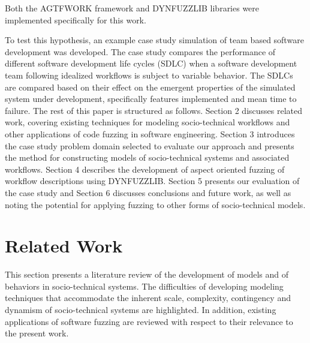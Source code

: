 \documentclass{llncs}
\begin{document}
Both the AGTFWORK framework and DYNFUZZLIB libraries were implemented specifically for this work.

To test this hypothesis, an example case study simulation of team based software development was developed.  The case
study compares the performance of different software development life cycles (SDLC) when a software development team
following idealized workflows is subject to variable behavior.  The SDLCs are compared based on their effect on the
emergent properties of the simulated system under development, specifically features implemented and mean time to
failure.  The rest of this paper is structured as follows.  Section 2 discusses related work, covering existing
techniques for modeling socio-technical workflows and other applications of code fuzzing in software engineering.
Section 3 introduces the case study problem domain selected to evaluate our approach and presents the method for
constructing models of socio-technical systems and associated workflows. Section 4 describes the development of aspect
oriented fuzzing of workflow descriptions using DYNFUZZLIB.  Section 5 presents our evaluation of the case study and
Section 6 discusses conclusions and future work, as well as noting the potential for applying fuzzing to other forms of
socio-technical models.

\section{Related Work}

This section presents a literature review of the development of models and of behaviors in socio-technical systems.  The
difficulties of developing modeling techniques that accommodate the inherent scale, complexity, contingency and dynamism
of socio-technical systems are highlighted.  In addition, existing applications of software fuzzing are reviewed with
respect to their relevance to the present work.
\end{document}
